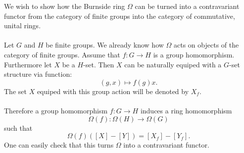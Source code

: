 \documentclass[12pt]{article}
\begin{document}
We wish to show how the Burnside ring $\Omega$ can be turned into a contravariant functor from the category of finite groups into the category of commutative, unital rings.\\ \\
Let $G$ and $H$ be finite groups. We already know how $\Omega$ acts on objects of the category of finite groups. Assume that $f:G\rightarrow H$ is a group homomorphism. Furthermore let $X$ be a $H$-set. Then $X$ can be naturally equiped with a $G$-set structure via function:
$$(g,x)\longmapsto f(g)x.$$
The set $X$ equiped with this group action will be denoted by $X_{f}$.\\ \\
Therefore a group homomorphism $f:G\rightarrow H$ induces a ring homomorphism $$\Omega(f):\Omega(H)\rightarrow\Omega(G)$$ such that $$\Omega(f)([X]-[Y])=[X_{f}]-[Y_{f}].$$ One can easily check that this turns $\Omega$ into a contravariant functor.
\end{document}

